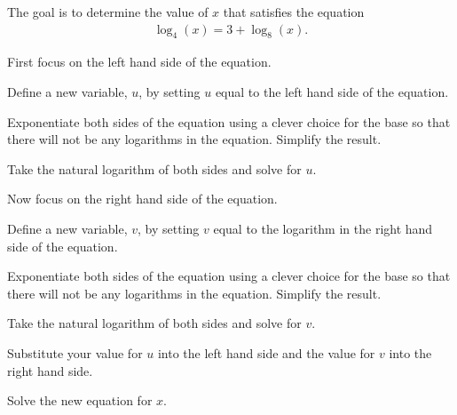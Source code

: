 \begin{problem}
\item The goal is to determine the value of $x$ that satisfies the
  equation
  \begin{eqnarray*}
    \log_4(x) = 3 + \log_8(x).
  \end{eqnarray*}
  \vspace{-2em}
  \begin{subproblem}
  \item First focus on the left hand side of the equation.
    \begin{subsubproblem}
    \item Define a new variable, $u$, by setting $u$ equal to the left
      hand side of the equation.
      \vspace{1em}
    \item Exponentiate both sides of the equation using a clever
      choice for the base so that there will not be any logarithms in
      the equation. Simplify the result.
      \vspace{2em}
    \item Take the natural logarithm of both sides and solve for $u$.
      \vspace{2em}
    \end{subsubproblem}
  \item Now focus on the right hand side of the equation.
    \begin{subsubproblem}
    \item Define a new variable, $v$, by setting $v$ equal to the
      logarithm in the right hand side of the equation.  
      \vspace{1em}
    \item Exponentiate both sides of the equation using a clever
      choice for the base so that there will not be any logarithms in
      the equation. Simplify the result.
      \vspace{2em}
    \item Take the natural logarithm of both sides and solve for $v$.
      \vspace{2em}
    \end{subsubproblem}
  \item Substitute your value for $u$ into the left hand side and the
    value for $v$ into the right hand side.
    \vspace{1em}
  \item Solve the new equation for $x$.
    \vfill
  \end{subproblem}

\clearpage


\end{problem}
